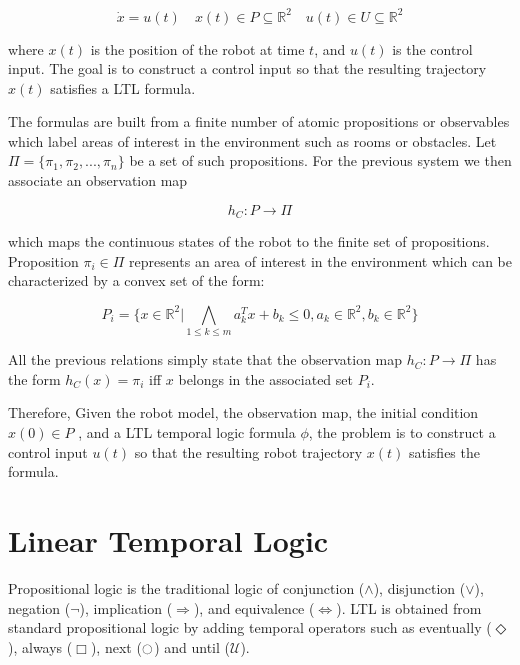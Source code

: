 \documentclass[conference,12pt]{IEEEtran}
\begin{document}
\begin{equation}
\dot{x} = u(t) \quad x(t) \in P \subseteq \mathbb{R}^2 \quad u(t) \in U \subseteq \mathbb{R}^2
\end{equation}

where $x(t)$ is the position of the robot at time $t$, and $u(t)$ is the control input. The goal is to construct
a control input so that the resulting trajectory $x(t)$ satisfies a LTL formula.

The formulas are built from a finite number of atomic propositions or observables which label areas of interest in the environment such as rooms or obstacles. Let $\Pi = \{ \pi_1, \pi_2,..., \pi_n \}$ be a set of such propositions. For the previous system we then associate an observation map

\begin{equation}
h_C : P \rightarrow \Pi
\end{equation}

which maps the continuous states of the robot to the finite set of propositions. Proposition $\pi_i \in \Pi$ represents an area of interest in the environment which can be characterized by a convex set of the form:

\begin{equation}
P_i = \{x \in \mathbb{R}^2|\bigwedge_{1 \leq k \leq m}a_k^Tx+b_k \leq 0, a_k \in \mathbb{R}^2,b_k \in \mathbb{R}^2 \}
\end{equation}

All the previous relations simply state that the observation map $h_C : P \rightarrow \Pi$ has the form $h_C(x) = \pi_i$ iff $x$ belongs in the associated set $P_i$.

Therefore, Given the robot model, the observation map, the initial condition $x(0) \in P$ , and a LTL temporal logic formula $\phi$,  the problem is to construct a control input $u(t)$ so that the resulting robot trajectory $x(t)$ satisfies the formula.

\section{Linear Temporal Logic}

Propositional logic is the traditional logic of conjunction ($\wedge$), disjunction ($\vee$), negation ($\neg$), implication ($\Rightarrow$), and equivalence ($\Leftrightarrow$). LTL is obtained from standard propositional logic by adding temporal operators such as eventually ($\Diamond$), always ($\Box$), next ($\ocircle$) and until ($\mathcal{U}$).
\end{document}
